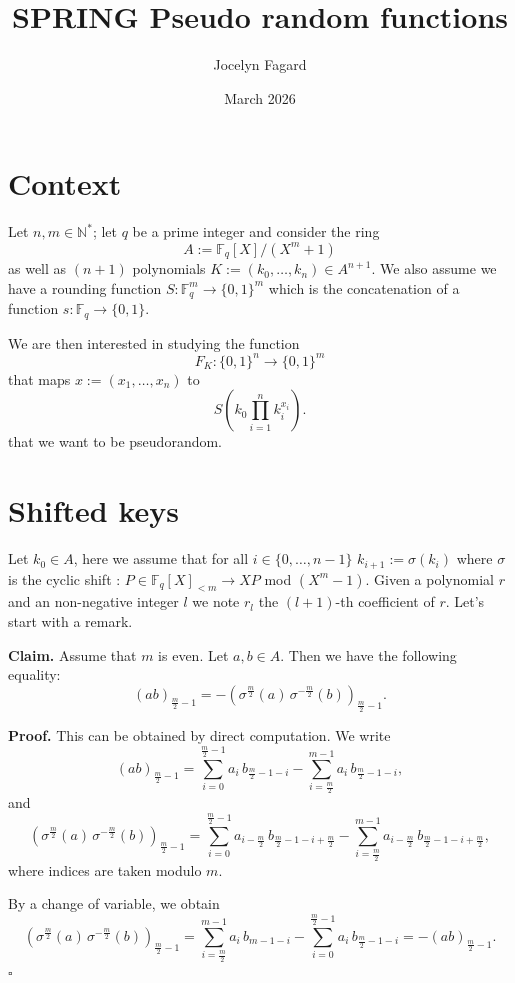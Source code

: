 \documentclass{article}
\title{SPRING Pseudo random functions}
\author{Jocelyn Fagard}
\date{March 2026}
\begin{document}
\maketitle

\section{Context}
Let $n,m \in \mathbb{N}^*$; let $q$ be a prime integer and consider the ring
\[
A := \mathbb{F}_q[X]/(X^m + 1)
\]
as well as $(n+1)$ polynomials $K:=(k_0, \dots, k_n) \in A^{n+1}$.
We also assume we have a rounding function $S : \mathbb{F}_q^m \to \{0,1\}^m$ which is the concatenation of a function $s : \mathbb{F}_q \to \{0,1\}$.

We are then interested in studying the function
\[
F_K : \{0,1\}^n \to \{0,1\}^m
\]
that maps $x := (x_1, \dots, x_n)$ to
\[
S\!\left( k_0 \prod_{i=1}^n k_i^{x_i} \right).
\] that we want to be pseudorandom.

\section{Shifted keys}
Let $k_0 \in A$, here we assume that for all $i \in \{0,\dots,n-1\}$ $k_{i+1}:= \sigma(k_i)$ where $\sigma$ is the cyclic shift  : $P \in \mathbb{F}_q[X]_{<m} \to X  P$ mod $(X^m-1)$.
Given a polynomial $r$ and an non-negative integer $l$ we note $r_l$ the $(l+1)$-th coefficient of $r$. Let's start with a remark.

\textbf{Claim.} Assume that $m$ is even.
Let $a,b \in A$. Then we have the following equality:
\[
(ab)_{\frac{m}{2} - 1}
=
- \left( \sigma^{\frac{m}{2}}(a)\, \sigma^{-\frac{m}{2}}(b) \right)_{\frac{m}{2} - 1}.
\]

\medskip

\textbf{Proof.}
This can be obtained by direct computation. We write
\[
(ab)_{\frac{m}{2} - 1}
=
\sum_{i=0}^{\frac{m}{2}-1} a_i \, b_{\frac{m}{2}-1 - i}
-
\sum_{i=\frac{m}{2}}^{m-1} a_i \, b_{\frac{m}{2}-1 - i},
\]
and
\[
\left( \sigma^{\frac{m}{2}}(a)\, \sigma^{-\frac{m}{2}}(b) \right)_{\frac{m}{2} - 1}
=
\sum_{i=0}^{\frac{m}{2}-1} a_{i-\frac{m}{2}} \, b_{\frac{m}{2}-1-i+\frac{m}{2}}
-
\sum_{i=\frac{m}{2}}^{m-1} a_{i-\frac{m}{2}} \, b_{\frac{m}{2}-1-i+\frac{m}{2}},
\]
where indices are taken modulo $m$.

By a change of variable, we obtain
\[
\left( \sigma^{\frac{m}{2}}(a)\, \sigma^{-\frac{m}{2}}(b) \right)_{\frac{m}{2} - 1}
=
\sum_{i=\frac{m}{2}}^{m-1} a_i \, b_{m-1-i}
-
\sum_{i=0}^{\frac{m}{2}-1} a_i \, b_{\frac{m}{2}-1-i}
=
- (ab)_{\frac{m}{2} - 1}.
\]
\hfill $\square$
\end{document}

